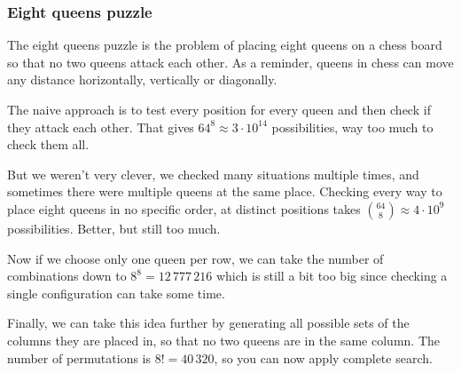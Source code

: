 \subsubsection{Eight queens puzzle}

The eight queens puzzle is the problem of placing eight queens on a chess board
so that no two queens attack each other.
As a reminder, queens in chess can move any distance
horizontally, vertically or diagonally.

The naive approach is to test every position for every queen and then check
if they attack each other.
That gives $64^8 \approx 3\cdot 10^{14}$ possibilities,
way too much to check them all.

But we weren't very clever, we checked many situations multiple times,
and sometimes there were multiple queens at the same place.
Checking every way to place eight queens in no specific order, at distinct
positions takes $\binom{64}{8} \approx 4\cdot 10^9$ possibilities.
Better, but still too much.

Now if we choose only one queen per row, we can take the number of combinations
down to $8^8 = 12\,777\,216$ which is still a bit too big since checking
a single configuration can take some time.

Finally, we can take this idea further by generating all possible sets
of the columns they are placed in, so that no two queens are in the same column.
The number of permutations is $8! = 40\,320$,
so you can now apply complete search.
